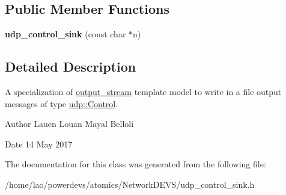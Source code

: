 \subsection*{Public Member Functions}
\begin{DoxyCompactItemize}
\item 
{\bfseries udp\+\_\+control\+\_\+sink} (const char $\ast$n)\hypertarget{classudp__control__sink_a3a5224e02175e0a55590ad1d7009fd61}{}\label{classudp__control__sink_a3a5224e02175e0a55590ad1d7009fd61}

\end{DoxyCompactItemize}


\subsection{Detailed Description}
A specialization of \hyperlink{classoutput__stream}{output\+\_\+stream} template model to write in a file output messages of type \hyperlink{structudp_1_1Control}{udp\+::\+Control}. 

\begin{DoxyAuthor}{Author}
Lauen Louan Mayal Belloli 
\end{DoxyAuthor}
\begin{DoxyDate}{Date}
14 May 2017 
\end{DoxyDate}


The documentation for this class was generated from the following file\+:\begin{DoxyCompactItemize}
\item 
/home/lao/powerdevs/atomics/\+Network\+D\+E\+V\+S/udp\+\_\+control\+\_\+sink.\+h\end{DoxyCompactItemize}
